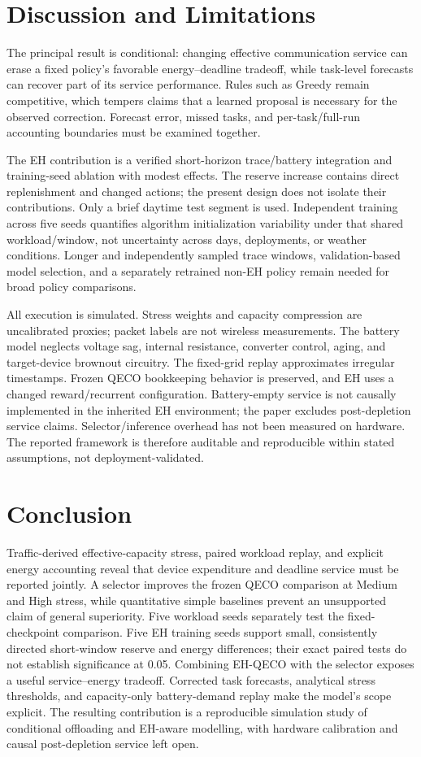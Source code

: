 \documentclass[conference]{IEEEtran}
\begin{document}
\section{Discussion and Limitations}
The principal result is conditional: changing effective communication service can erase a fixed policy's favorable energy--deadline tradeoff, while task-level forecasts can recover part of its service performance. Rules such as Greedy remain competitive, which tempers claims that a learned proposal is necessary for the observed correction. Forecast error, missed tasks, and per-task/full-run accounting boundaries must be examined together.

The EH contribution is a verified short-horizon trace/battery integration and training-seed ablation with modest effects. The reserve increase contains direct replenishment and changed actions; the present design does not isolate their contributions. Only a brief daytime test segment is used. Independent training across five seeds quantifies algorithm initialization variability under that shared workload/window, not uncertainty across days, deployments, or weather conditions. Longer and independently sampled trace windows, validation-based model selection, and a separately retrained non-EH policy remain needed for broad policy comparisons.

All execution is simulated. Stress weights and capacity compression are uncalibrated proxies; packet labels are not wireless measurements. The battery model neglects voltage sag, internal resistance, converter control, aging, and target-device brownout circuitry. The fixed-grid replay approximates irregular timestamps. Frozen QECO bookkeeping behavior is preserved, and EH uses a changed reward/recurrent configuration. Battery-empty service is not causally implemented in the inherited EH environment; the paper excludes post-depletion service claims. Selector/inference overhead has not been measured on hardware. The reported framework is therefore auditable and reproducible within stated assumptions, not deployment-validated.

\section{Conclusion}
Traffic-derived effective-capacity stress, paired workload replay, and explicit energy accounting reveal that device expenditure and deadline service must be reported jointly. A selector improves the frozen QECO comparison at Medium and High stress, while quantitative simple baselines prevent an unsupported claim of general superiority. Five workload seeds separately test the fixed-checkpoint comparison. Five EH training seeds support small, consistently directed short-window reserve and energy differences; their exact paired tests do not establish significance at 0.05. Combining EH-QECO with the selector exposes a useful service--energy tradeoff. Corrected task forecasts, analytical stress thresholds, and capacity-only battery-demand replay make the model's scope explicit. The resulting contribution is a reproducible simulation study of conditional offloading and EH-aware modelling, with hardware calibration and causal post-depletion service left open.
\end{document}
